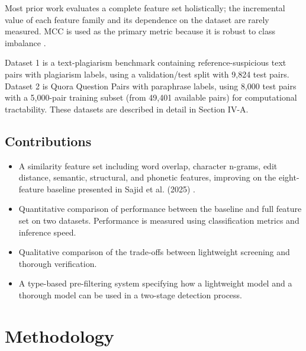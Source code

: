 \documentclass[conference]{IEEEtran}
\begin{document}
Most prior work evaluates a complete feature set holistically;
the incremental value of each feature family and its dependence
on the dataset are rarely measured. MCC is used as the primary
metric because it is robust to class imbalance \cite{chicco2020}.

Dataset 1 is a text-plagiarism benchmark containing reference-suspicious
text pairs with plagiarism labels, using a validation/test split with
9,824 test pairs. Dataset 2 is Quora Question Pairs with paraphrase labels,
using 8,000 test pairs with a 5,000-pair training subset (from 49,401
available pairs) for computational tractability. These datasets are
described in detail in Section IV-A.


\subsection{Contributions}

\begin{itemize}

    \item A similarity feature set including word overlap,
    character n-grams, edit distance, semantic, structural,
    and phonetic features, improving on the eight-feature
    baseline presented in Sajid et al. (2025) \cite{sajid2025}.

    \item Quantitative comparison of performance between the
    baseline and full feature set on two datasets. Performance
    is measured using classification metrics and inference speed.

    \item Qualitative comparison of the trade-offs between
    lightweight screening and thorough verification.

    \item A type-based pre-filtering system specifying how a
    lightweight model and a thorough model can be used in a
    two-stage detection process.

\end{itemize}


\section{Methodology}
\end{document}
